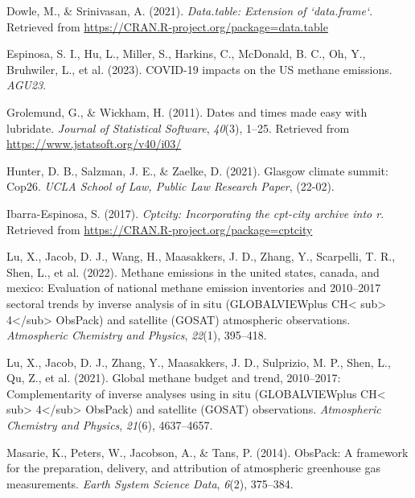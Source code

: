 \documentclass[10pt,a4paper,onecolumn]{article}
\newlength{\cslhangindent}
\newenvironment{CSLReferences}[2] %
 {\begin{list}{}{%
  \setlength{\itemindent}{0pt}
  \setlength{\leftmargin}{0pt}
  \setlength{\parsep}{0pt}
  \ifodd #1
   \setlength{\leftmargin}{\cslhangindent}
   \setlength{\itemindent}{-1\cslhangindent}
  \fi
  \setlength{\itemsep}{#2\baselineskip}}}
 {\end{list}}
\begin{document}
\label{refs}
\begin{CSLReferences}{1}{0}
Dowle, M., \& Srinivasan, A. (2021). \emph{Data.table: Extension of
`data.frame`}. Retrieved from
\url{https://CRAN.R-project.org/package=data.table}

Espinosa, S. I., Hu, L., Miller, S., Harkins, C., McDonald, B. C., Oh,
Y., Bruhwiler, L., et al. (2023). COVID-19 impacts on the US methane
emissions. \emph{AGU23}.

Grolemund, G., \& Wickham, H. (2011). Dates and times made easy with
{lubridate}. \emph{Journal of Statistical Software}, \emph{40}(3),
1--25. Retrieved from \url{https://www.jstatsoft.org/v40/i03/}

Hunter, D. B., Salzman, J. E., \& Zaelke, D. (2021). Glasgow climate
summit: Cop26. \emph{UCLA School of Law, Public Law Research Paper},
(22-02).

Ibarra-Espinosa, S. (2017). \emph{Cptcity: Incorporating the cpt-city
archive into r}. Retrieved from
\url{https://CRAN.R-project.org/package=cptcity}

Lu, X., Jacob, D. J., Wang, H., Maasakkers, J. D., Zhang, Y., Scarpelli,
T. R., Shen, L., et al. (2022). Methane emissions in the united states,
canada, and mexico: Evaluation of national methane emission inventories
and 2010--2017 sectoral trends by inverse analysis of in situ
(GLOBALVIEWplus CH\textless{} sub\textgreater{}
4\textless/sub\textgreater{} ObsPack) and satellite (GOSAT) atmospheric
observations. \emph{Atmospheric Chemistry and Physics}, \emph{22}(1),
395--418.

Lu, X., Jacob, D. J., Zhang, Y., Maasakkers, J. D., Sulprizio, M. P.,
Shen, L., Qu, Z., et al. (2021). Global methane budget and trend,
2010--2017: Complementarity of inverse analyses using in situ
(GLOBALVIEWplus CH\textless{} sub\textgreater{}
4\textless/sub\textgreater{} ObsPack) and satellite (GOSAT)
observations. \emph{Atmospheric Chemistry and Physics}, \emph{21}(6),
4637--4657.

Masarie, K., Peters, W., Jacobson, A., \& Tans, P. (2014). ObsPack: A
framework for the preparation, delivery, and attribution of atmospheric
greenhouse gas measurements. \emph{Earth System Science Data},
\emph{6}(2), 375--384.


\end{CSLReferences}
\end{document}
